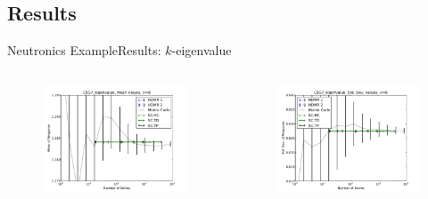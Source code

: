 \documentclass{beamer}
\begin{document}
\subsection{Results}
\begin{frame}{Neutronics Example}{Results: $k$-eigenvalue}%
  \begin{columns}
    \begin{column}{0.5\textwidth}
      \begin{figure}
        \centering
        \includegraphics[width=\linewidth]{c5g7/C5G7_eigenvalue_mean_vals}
      \end{figure}
    \end{column}
    \begin{column}{0.5\textwidth}
      \begin{figure}
        \centering
        \includegraphics[width=\linewidth]{c5g7/C5G7_eigenvalue_var_vals}
      \end{figure}
    \end{column}
  \end{columns}
\end{frame}
\end{document}
